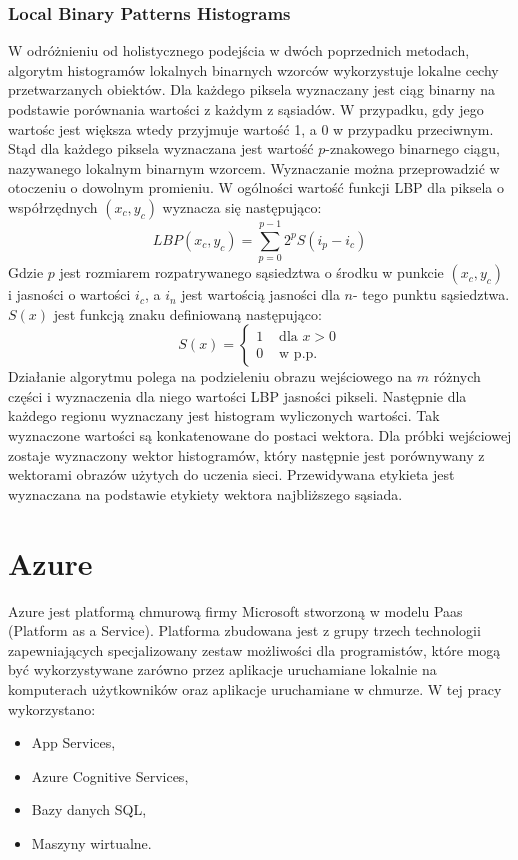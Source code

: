 \subsubsection{Local Binary Patterns Histograms} \label{lbph}
W odróżnieniu od holistycznego podejścia w dwóch poprzednich metodach, algorytm histogramów lokalnych binarnych wzorców wykorzystuje lokalne cechy przetwarzanych obiektów.
Dla każdego piksela wyznaczany jest ciąg binarny na podstawie porównania wartości z każdym z sąsiadów. W przypadku, gdy jego wartośc jest większa wtedy przyjmuje wartość 1, a 0 w przypadku przeciwnym. Stąd dla każdego piksela wyznaczana jest wartość $p$-znakowego binarnego ciągu, nazywanego lokalnym binarnym wzorcem.  Wyznaczanie można przeprowadzić w otoczeniu o dowolnym promieniu. W ogólności wartość funkcji LBP dla piksela o współrzędnych $(x_{c},y_{c})$ wyznacza się następująco: 
$$
LBP(x_{c},y_{c})=\sum_{p=0}^{p-1}2^{p}S(i_{p}-i_{c})
$$
Gdzie $p$ jest rozmiarem rozpatrywanego sąsiedztwa o środku w punkcie $(x_{c},y_{c})$ i jasności o wartości $i_{c}$, a $i_{n}$ jest wartością jasności dla $n$- tego punktu sąsiedztwa.
$S(x)$ jest funkcją znaku definiowaną następująco:
$$
S(x) = \left\{ \begin{array}{ll}
1 & \textrm{ dla $x>0$}\\
0 & \textrm{ w p.p.}
\end{array} \right.
$$
Działanie algorytmu polega na podzieleniu obrazu wejściowego na $m$ różnych części i wyznaczenia dla niego wartości LBP jasności pikseli. Następnie dla każdego regionu wyznaczany jest histogram wyliczonych wartości. Tak wyznaczone wartości są konkatenowane do postaci wektora.
Dla próbki wejściowej zostaje wyznaczony wektor histogramów, który następnie jest porównywany z wektorami obrazów użytych do uczenia sieci. Przewidywana etykieta jest wyznaczana na podstawie etykiety wektora najbliższego sąsiada.

\section{Azure} \label{azure}
Azure jest platformą chmurową firmy Microsoft stworzoną w modelu Paas (Platform as a Service). Platforma zbudowana jest z grupy trzech technologii zapewniających specjalizowany zestaw możliwości dla programistów, które mogą być wykorzystywane zarówno przez aplikacje uruchamiane lokalnie na komputerach użytkowników oraz aplikacje uruchamiane w chmurze. W tej pracy wykorzystano:
\begin{itemize}
    \item App Services,
    \item Azure Cognitive Services,
    \item Bazy danych SQL,
    \item Maszyny wirtualne.
\end{itemize}
